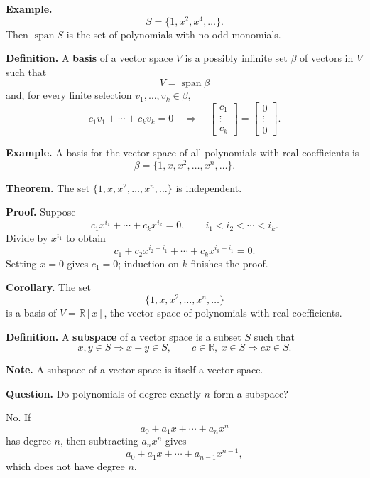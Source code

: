 \documentclass[letterpaper]{article}
\begin{document}
\textbf{Example.}
\[
S=\{1,x^2,x^4,\ldots\}.
\]
Then $\operatorname{span}S$ is the set of polynomials with no odd monomials.

\bigskip

\textbf{Definition.} A \textbf{basis} of a vector space $V$ is a possibly infinite set $\beta$ of vectors in $V$ such that
\[
V=\operatorname{span}\beta
\]
and, for every finite selection $v_1,\ldots,v_k\in\beta$,
\[
c_1v_1+\cdots+c_kv_k=0
\quad\Longrightarrow\quad
\begin{bmatrix}c_1\\ \vdots\\ c_k\end{bmatrix}
=
\begin{bmatrix}0\\ \vdots\\ 0\end{bmatrix}.
\]

\medskip

\textbf{Example.} A basis for the vector space of all polynomials with real coefficients is
\[
\beta=\{1,x,x^2,\ldots,x^n,\ldots\}.
\]

\textbf{Theorem.} The set $\{1,x,x^2,\ldots,x^n,\ldots\}$ is independent.

\textbf{Proof.} Suppose
\[
c_1x^{i_1}+\cdots+c_kx^{i_k}=0,
\qquad i_1<i_2<\cdots<i_k.
\]
Divide by $x^{i_1}$ to obtain
\[
c_1+c_2x^{i_2-i_1}+\cdots+c_kx^{i_k-i_1}=0.
\]
Setting $x=0$ gives $c_1=0$; induction on $k$ finishes the proof.

\newpage

\textbf{Corollary.} The set
\[
\{1,x,x^2,\ldots,x^n,\ldots\}
\]
is a basis of $V=\mathbb{R}[x]$, the vector space of polynomials with real coefficients.

\bigskip

\textbf{Definition.} A \textbf{subspace} of a vector space is a subset $S$ such that
\[
x,y\in S\Longrightarrow x+y\in S,
\qquad
c\in\mathbb{R},\ x\in S\Longrightarrow cx\in S.
\]

\textbf{Note.} A subspace of a vector space is itself a vector space.

\medskip

\textbf{Question.} Do polynomials of degree exactly $n$ form a subspace?

\medskip

No. If
\[
a_0+a_1x+\cdots+a_nx^n
\]
has degree $n$, then subtracting $a_nx^n$ gives
\[
a_0+a_1x+\cdots+a_{n-1}x^{n-1},
\]
which does not have degree $n$.

\medskip
\end{document}
